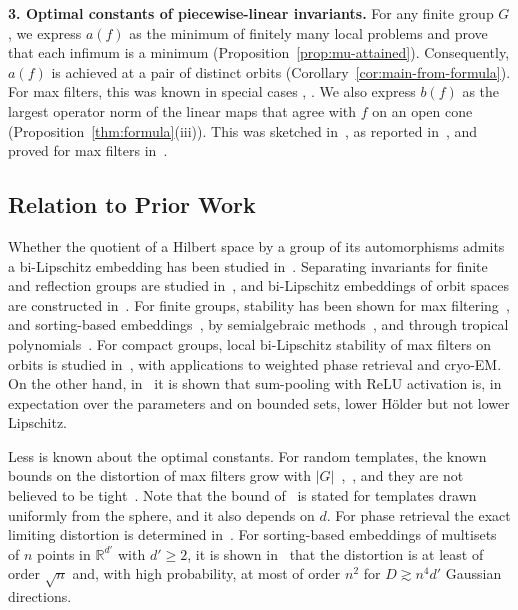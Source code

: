 \documentclass[11pt]{article}
\newcommand{\R}{\mathbb{R}}
\theoremstyle{definition}
\begin{document}
	\smallskip
	\noindent\textbf{3. Optimal constants of piecewise-linear invariants.}
	For any finite group $G$, we express $a(f)$ as the minimum of
	finitely many local problems and prove that each infimum is
	a minimum (Proposition~\ref{prop:mu-attained}).
	Consequently, $a(f)$ is achieved at a pair of distinct orbits
	(Corollary~\ref{cor:main-from-formula}).
	For max filters, this was known in special cases
	\cite[Lem.~27]{mixonqaddura},
	\cite[Lem.~9]{mixonpacker}.
	We also express $b(f)$ as the largest operator norm of the
	linear maps that agree with $f$ on an open cone
	(Proposition~\ref{thm:formula}(iii)).
	This was sketched in~\cite{ghoreishi2024maxfilter}, as reported
	in~\cite[Sec.~3.1]{mixonqaddura}, and proved for max filters
	in~\cite[Thm.~14]{mixonqaddura}.
	

\subsection*{Relation to Prior Work}

 Whether the quotient of a Hilbert space by a group of its automorphisms admits a
bi-Lipschitz embedding has been studied
in~\cite{cahill2024towards}. Separating invariants for finite and reflection groups
are studied in~\cite{DUFRESNE20091979,compuinvar,dadok1985polar,edidin2025orbit}, and
bi-Lipschitz embeddings of orbit spaces are constructed
in~\cite{eriksson2018quantitative,weighill2023coarse,derksen2024bilipschitz,blumsmith2025distortion}.
For finite groups, stability has been shown for max
filtering~\cite{cahill2025group,mixonpacker,mixonqaddura,cahill2026approx},
and sorting-based embeddings~\cite{balan2023stab,balan2023inj,balan2024sorting}, by
semialgebraic methods~\cite{bendory2025phase,bendory2025generalized,amir2025stability},
and through tropical polynomials~\cite{derksen2025tropical,kubo2026stable}.
For compact groups, local bi-Lipschitz stability of max filters on
orbits is studied in~\cite{qaddura2025max}, with applications
to weighted phase retrieval and cryo-EM.
On the other hand, in~\cite{davidson2024holder} it is shown that sum-pooling with ReLU
activation is, in expectation over the parameters and on bounded sets, lower H\"older but not
lower Lipschitz.

Less is known about the optimal constants. For random templates, the known bounds on the
distortion of max filters grow with
$|G|$~\cite[Thm.~32]{mixonqaddura},~\cite[Thm.~18]{cahill2025group}, and they are not believed
to be tight~\cite{cahill2026approx}. Note that the bound of~\cite[Thm.~18]{cahill2025group} is
stated for templates drawn uniformly from the sphere, and it also depends on $d$. For
phase retrieval the exact limiting distortion is
determined in~\cite{xia2024stability}. For sorting-based embeddings of multisets of $n$
points in $\R^{d'}$ with $d'\ge2$, it is shown in~\cite{dym2026quant} that the distortion is
at least of order $\sqrt n$ and, with high
probability, at most of order $n^2$ for $D\gtrsim n^4d'$ Gaussian directions.
\end{document}
